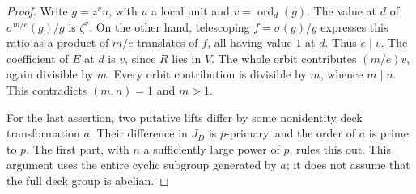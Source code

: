 \begin{proof}
Write $g=z^v u$, with $u$ a local unit and $v=\operatorname{ord}_d(g)$.
The value at $d$ of $\sigma^{m/e}(g)/g$ is $\zeta^v$. On the other
hand, telescoping $f=\sigma(g)/g$ expresses this ratio as a product
of $m/e$ translates of $f$, all having value $1$ at $d$. Thus
$e\mid v$. The coefficient of $E$ at $d$ is $v$, since $R$ lies in
$V$. The whole orbit contributes $(m/e)v$, again divisible by $m$.
Every orbit contribution is divisible by $m$, whence $m\mid n$.
This contradicts $(m,n)=1$ and $m>1$.

For the last assertion, two putative lifts differ by some nonidentity
deck transformation $a$. Their difference in $J_D$ is $p$-primary,
and the order of $a$ is prime to $p$. The first part, with $n$ a
sufficiently large power of $p$, rules this out. This argument uses
the entire cyclic subgroup generated by $a$; it does not assume that
the full deck group is abelian.
\end{proof}

